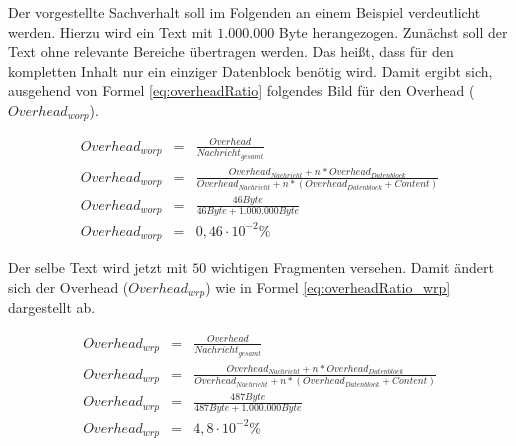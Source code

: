 Der vorgestellte Sachverhalt soll im Folgenden an einem Beispiel
verdeutlicht werden. Hierzu wird ein Text mit $1.000.000$ Byte herangezogen.
Zunächst soll der Text ohne relevante Bereiche übertragen werden. Das heißt,
dass für den kompletten Inhalt nur ein einziger Datenblock benötig wird. Damit
ergibt sich, ausgehend von Formel \ref{eq:overheadRatio} folgendes Bild für den
Overhead ($Overhead_{worp}$).


\begin{eqnarray} 
	Overhead_{worp} & = & \frac{Overhead}{Nachricht_{gesamt}}\\
	Overhead_{worp} & = & \frac{Overhead_{Nachricht} + n * Overhead_{Datenblock}}{Overhead_{Nachricht} + n * (Overhead_{Datenblock} + Content)}\\
	Overhead_{worp} & = & \frac{46 Byte}{46 Byte + 1.000.000 Byte} \\
	Overhead_{worp} & = & 0,46 \cdot 10^{-2} \%
	\label{eq:overheadRatio_worp}
\end{eqnarray}

Der selbe Text wird jetzt mit $50$ wichtigen Fragmenten versehen. Damit ändert
sich der Overhead ($Overhead_{wrp}$) wie in Formel \ref{eq:overheadRatio_wrp}
dargestellt ab.


\begin{eqnarray} 
	Overhead_{wrp} & = & \frac{Overhead}{Nachricht_{gesamt}}\\
	Overhead_{wrp} & = & \frac{Overhead_{Nachricht} + n * Overhead_{Datenblock}}{Overhead_{Nachricht} + n * (Overhead_{Datenblock} + Content)}\\
	Overhead_{wrp} & = & \frac{487 Byte}{487 Byte + 1.000.000 Byte} \\
	Overhead_{wrp} & = & 4,8 \cdot 10^{-2} \%
	\label{eq:overheadRatio_wrp}
\end{eqnarray}

